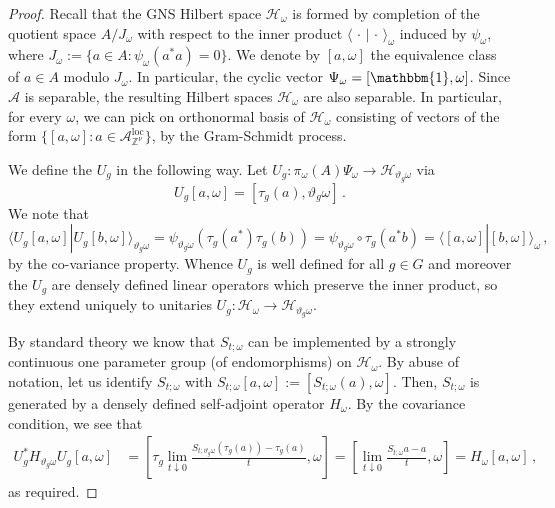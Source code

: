 \documentclass{article}
\newcommand{\one}{\mathbbm{1}}
\newcommand{\A}{\mathcal{A}}
\DeclareMathOperator{\loc}{loc}
\newcommand{\aloc}{\mathcal{A}_{\mathbb{Z}^\nu}^{\loc}}
\newcommand{\<}{\langle}
\renewcommand{\>}{\rangle}
\theoremstyle{definition}
\numberwithin{equation}{section}
\begin{document}
\begin{proof}
    Recall that the GNS Hilbert space $\mathcal{H}_\omega$ is formed by completion of the quotient space $A/J_\omega$ with respect to the inner product $\<\,\cdot\,|\,\cdot\,\>_\omega$ induced by $\psi_\omega$, where $J_\omega := \{a\in A\colon \psi_\omega(a^*a) =0\}$. We denote by $[a,\omega]$ the equivalence class of $a\in A$ modulo $J_\omega$. In particular, the cyclic vector $\Psi_\omega = [\one, \omega]$. Since $\A$ is separable, the resulting Hilbert spaces $\mathcal{H}_\omega$ are also separable. In particular, for every $\omega$, we can pick on orthonormal basis of $\mathcal{H}_\omega$ consisting of vectors of the form $\{[a,\omega]\colon a\in \aloc\}$, by the Gram-Schmidt process.

    We define the $U_g$ in the following way. Let $U_g: \pi_\omega(A)\Psi_\omega \to \mathcal{H}_{\vartheta_g \omega}$ via
    \begin{equation}
        U_g[a,\omega] = [\tau_g(a), \vartheta_g \omega]\,.
    \end{equation} We note that 
    \[
        \<U_g [a, \omega]| U_g[b,\omega]\>_{\vartheta_g \omega}= \psi_{\vartheta_g\omega} ( \tau_g(a^*) \tau_g(b)) = \psi_{\vartheta_g \omega} \circ \tau_g (a^*b) = \<[a, \omega]| [b, \omega]\>_\omega\,,
    \] by the co-variance property. Whence $U_g$ is well defined for all $g\in G$ and moreover the $U_g$ are densely defined linear operators which preserve the inner product, so they extend uniquely to unitaries $U_g : \mathcal{H}_\omega \to \mathcal{H}_{\vartheta_g \omega}$. 

    By standard theory we know that $S_{t;\omega}$ can be implemented by a strongly continuous one parameter group (of endomorphisms) on $\mathcal{H}_\omega$. By abuse of notation, let us identify $S_{t;\omega}$ with $S_{t;\omega}[a,\omega] := [S_{t;\omega}(a), \omega]$. Then, $S_{t;\omega}$ is generated by a densely defined self-adjoint operator $H_\omega$. By the covariance condition, we see that 
        \begin{align*}
            U_g^* H_{\vartheta_g \omega} U_g [a, \omega] &= [ \tau_g\lim_{t\downarrow 0}\frac{S_{t;\vartheta_g \omega}(\tau_g(a)) - \tau_g(a)}{t}, \omega]= [\lim_{t\downarrow 0} \frac{S_{t;\omega}a -a}{t}, \omega]= H_\omega [a, \omega]\,,
        \end{align*} as required. 


\end{proof}
\end{document}
